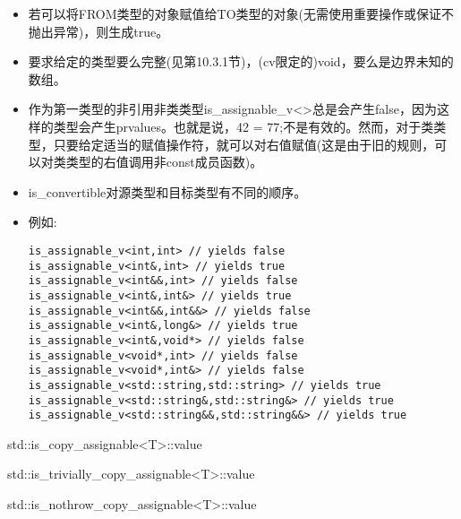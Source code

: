 \begin{itemize}
\item
若可以将FROM类型的对象赋值给TO类型的对象(无需使用重要操作或保证不抛出异常)，则生成true。

\item
要求给定的类型要么完整(见第10.3.1节)，(cv限定的)void，要么是边界未知的数组。

\item
作为第一类型的非引用非类类型is\_assignable\_v<>总是会产生false，因为这样的类型会产生prvalues。也就是说，42 = 77;不是有效的。然而，对于类类型，只要给定适当的赋值操作符，就可以对右值赋值(这是由于旧的规则，可以对类类型的右值调用非const成员函数)。

\item
is\_convertible对源类型和目标类型有不同的顺序。

\item
例如:
\begin{lstlisting}[style=styleCXX]
is_assignable_v<int,int> // yields false
is_assignable_v<int&,int> // yields true
is_assignable_v<int&&,int> // yields false
is_assignable_v<int&,int&> // yields true
is_assignable_v<int&&,int&&> // yields false
is_assignable_v<int&,long&> // yields true
is_assignable_v<int&,void*> // yields false
is_assignable_v<void*,int> // yields false
is_assignable_v<void*,int&> // yields false
is_assignable_v<std::string,std::string> // yields true
is_assignable_v<std::string&,std::string&> // yields true
is_assignable_v<std::string&&,std::string&&> // yields true
\end{lstlisting}
\end{itemize}

std::is\_copy\_assignable<T>::value

std::is\_trivially\_copy\_assignable<T>::value

std::is\_nothrow\_copy\_assignable<T>::value

